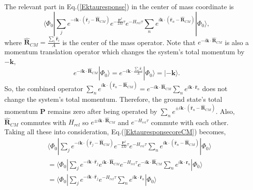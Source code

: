 \documentclass[12pt,letterpaper,UTF8]{report}
\begin{document}
{The relevant part in Eq.(\ref{Ektauresponse}) in the center of mass coordinate is
\begin{equation}\label{EktauresponsecoreCM}
 \langle \Phi_0| \sum_j e^{-i \bm{k} \cdot (\hat{\bm{r}}_j - \hat{\bm{R}}_{CM} )   } e^{- \frac{\bm{P}^2}{2M}\tau} e^{- H_{rel} \tau} \sum_n e^{ i \bm{k} \cdot (\hat{\bm{r}}_n - \hat{\bm{R}}_{CM} )  } | \Phi_0 \rangle ,
\end{equation}
where $\hat{\bm{R}}_{CM}=\frac{ \sum_{i} \hat{\bm{r}}_i}{A}$ is the center of the mass operator. Note that $e^{ - i\bm{k} \cdot \hat{\bm{R}}_{CM} }$ is also a momentum translation operator which changes the system's total momentum by $-\bm{k}$,
\begin{equation}
e^{ - i\bm{k} \cdot \hat{\bm{R}}_{CM} } | \Phi_0 \rangle = e^{ - i\bm{k} \cdot \frac{ \sum_{i} \hat{\bm{r}}_i}{A} } | \Phi_0 \rangle =  | -\bm{k} \rangle  .
\end{equation}
So, the combined operator $\sum_n e^{ i \bm{k} \cdot (\hat{\bm{r}}_n - \hat{\bm{R}}_{CM} )  } = e^{ - i\bm{k} \cdot \hat{\bm{R}}_{CM} } \sum_{n}e^{ i \bm{k} \cdot \hat{\bm{r}}_n }  $ does not change the system's total momentum.
Therefore, the ground state's total momentum $\bm{P}$ remains zero after being operated by $\sum_n e^{ \pm i \bm{k} \cdot (\hat{\bm{r}}_n - \hat{\bm{R}}_{CM} )  }$.
Also, $\hat{\bm{R}}_{CM}$ commutes with $H_{rel}$ so $e^{ \pm i\bm{k} \cdot \hat{\bm{R}}_{CM} } $ and $e^{- H_{rel} \tau}$ commute with each other.
Taking all these into consideration, Eq.(\ref{EktauresponsecoreCM}) becomes,
\begin{align}
& \langle \Phi_0| \sum_j e^{-i \bm{k} \cdot (\hat{\bm{r}}_j - \hat{\bm{R}}_{CM} )   } e^{- \frac{\bm{P}^2}{2M}\tau} e^{- H_{rel} \tau} \sum_n e^{ i \bm{k} \cdot (\hat{\bm{r}}_n - \hat{\bm{R}}_{CM} )  } | \Phi_0 \rangle \nonumber \\
&= \langle \Phi_0| \sum_j e^{-i \bm{k} \cdot \hat{\bm{r}}_j   }
e^{ i\bm{k} \cdot \hat{\bm{R}}_{CM} } e^{- H_{rel} \tau}
e^{ - i\bm{k} \cdot \hat{\bm{R}}_{CM} } \sum_{n}e^{ i \bm{k} \cdot \hat{\bm{r}}_n }  | \Phi_0 \rangle \nonumber \\
& = \langle \Phi_0| \sum_j e^{-i \bm{k} \cdot \hat{\bm{r}}_j } e^{- H_{rel} \tau} \sum_n e^{ i \bm{k} \cdot \hat{\bm{r}}_n } | \Phi_0 \rangle
\label{responsecomp2}
\end{align}

}
\end{document}
